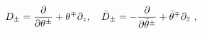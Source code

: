 \begin{equation}
D_{\pm}={\partial\over\partial\theta^{\pm}}+\theta^{\mp}\partial_z,
\quad
\bar{D}_{\pm}=-{\partial\over\partial\bar{\theta}^{\pm}}
              +\bar{\theta}^{\mp}\partial_{\bar{z}} \ ,
\end{equation}


